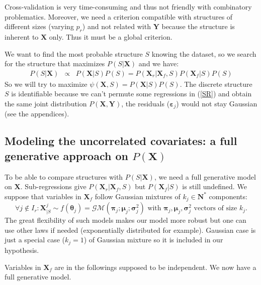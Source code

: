 \documentclass[11pt,a4paper]{article}
\begin{document}
Cross-validation is very time-consuming and thus not friendly with combinatory problematics. Moreover, we need a criterion compatible with structures of different sizes (varying $p_r$) and not related with $\boldsymbol{Y}$ because the structure is inherent to $\boldsymbol{X}$ only. Thus it must be a global criterion. 	

We want to find the most probable structure $S$ knowing the dataset, so we search for the structure that maximizes $P(S|\boldsymbol{X})$ and we have:	
	\begin{eqnarray}
	 \label{approxBIC} P(S|\boldsymbol{X})&\propto & P(\boldsymbol{X}|S)P(S)
	=P(\boldsymbol{X}_r|\boldsymbol{X}_f,S)P(\boldsymbol{X}_f|S)P(S)
	\end{eqnarray}
So we will try to maximize $\psi(\boldsymbol{X},S)=P(\boldsymbol{X}|S)P(S)$.
	The discrete structure $S$ is identifiable because we can't permute some regressions in (\ref{SR}) and obtain the same joint distribution $P(\boldsymbol{X},\boldsymbol{Y})$, the residuals ($\boldsymbol{\varepsilon}_j$) would not stay Gaussian (see the appendices).

	\subsection{Modeling the uncorrelated covariates: a full generative approach on $P(\boldsymbol{X})$}
	To be able to compare structures with $P(S|\boldsymbol{X})$, we need a full generative model on $\boldsymbol{X}$. Sub-regressions give $P(\boldsymbol{X}_r|\boldsymbol{X}_f,S) $ but $P(\boldsymbol{X}_f|S)$ is still undefined. We suppose that variables in $\boldsymbol{X}_f$ follow Gaussian mixtures of $k_j \in \mathbf{N}^*$ components: 
	\begin{equation}
			\forall j \notin I_r : \boldsymbol{X}^j_{|S} \sim f(\boldsymbol{\theta}_j)=\mathcal{GM}(\boldsymbol{\pi}_j;\boldsymbol{\mu}_j;\boldsymbol{\sigma}^2_j) \textrm{ with } \boldsymbol{\pi}_j,\boldsymbol{\mu}_j,\boldsymbol{\sigma}^2_j \textrm{ vectors of size } k_j. \label{mixtureX1}
		\end{equation}
		The great flexibility \cite{mclachlan2004finite} of such models makes our model more robust but one can use other laws if needed (exponentially distributed for example). Gaussian case is just a special case ($k_j=1$) of Gaussian mixture so it is included in our hypothesis.

		Variables in $\boldsymbol{X}_f$ are in the followings supposed to be independent.
	We now have a full generative model.
	
\end{document}
